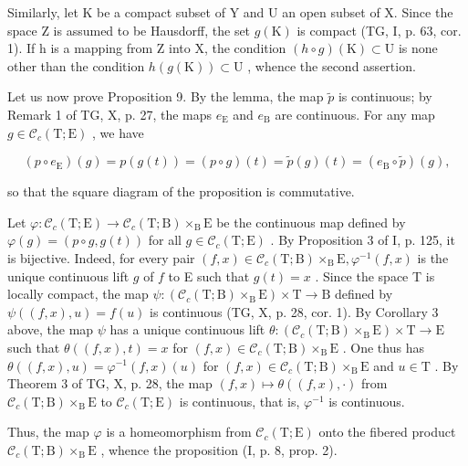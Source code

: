 Similarly, let K be a compact subset of Y and U an open subset of X. Since the space Z is assumed to be Hausdorff, the set \(g(\mathrm{K})\) is compact (TG, I, p. 63, cor. 1). If h is a mapping from Z into X, the condition \((h \circ g)(\mathrm{K}) \subset \mathrm{U}\) is none other than the condition \(h(g(\mathrm{K})) \subset \mathrm{U}\) , whence the second assertion.

Let us now prove Proposition 9. By the lemma, the map \(\widetilde{p}\) is continuous; by Remark 1 of TG, X, p. 27, the maps \(e_{\mathrm{E}}\) and \(e_{\mathrm{B}}\) are continuous. For any map \(g \in \mathcal{C}_c(\mathrm{T};\mathrm{E})\) , we have

\[
(p \circ e _ {\mathrm{E}}) (g) = p (g (t)) = (p \circ g) (t) = \widetilde {p} (g) (t) = \left(e _ {\mathrm{B}} \circ \widetilde {p}\right) (g),
\]

so that the square diagram of the proposition is commutative.

Let \(\varphi\colon\mathcal{C}_{c}(\mathrm{T};\mathrm{E})\to\mathcal{C}_{c}(\mathrm{T};\mathrm{B})\times_{\mathrm{B}}\mathrm{E}\) be the continuous map defined by \(\varphi(g)=(p\circ g,g(t))\) for all \(g\in\mathcal{C}_{c}(\mathrm{T};\mathrm{E})\) . By Proposition 3 of I, p. 125, it is bijective. Indeed, for every pair \((f,x)\in\mathcal{C}_{c}(\mathrm{T};\mathrm{B})\times_{\mathrm{B}}\mathrm{E},\varphi^{-1}(f,x)\) is the unique continuous lift \(g\) of \(f\) to E such that \(g(t)=x\) . Since the space T is locally compact, the map \(\psi\colon(\mathcal{C}_{c}(\mathrm{T};\mathrm{B})\times_{\mathrm{B}}\mathrm{E})\times\mathrm{T}\to\mathrm{B}\) defined by \(\psi((f,x),u)=f(u)\) is continuous (TG, X, p. 28, cor. 1). By Corollary 3 above, the map \(\psi\) has a unique continuous lift \(\theta\colon(\mathcal{C}_{c}(\mathrm{T};\mathrm{B})\times_{\mathrm{B}}\mathrm{E})\times\mathrm{T}\to\mathrm{E}\) such that \(\theta((f,x),t)=x\) for \((f,x)\in\mathcal{C}_{c}(\mathrm{T};\mathrm{B})\times_{\mathrm{B}}\mathrm{E}\) . One thus has \(\theta((f,x),u)=\varphi^{-1}(f,x)(u)\) for \((f,x)\in\mathcal{C}_{c}(\mathrm{T};\mathrm{B})\times_{\mathrm{B}}\mathrm{E}\) and \(u\in\mathrm{T}\) . By Theorem 3 of TG, X, p. 28, the map \((f,x)\mapsto\theta((f,x),\cdot)\) from \(\mathcal{C}_{c}(\mathrm{T};\mathrm{B})\times_{\mathrm{B}}\mathrm{E}\) to \(\mathcal{C}_{c}(\mathrm{T};\mathrm{E})\) is continuous, that is, \(\varphi^{-1}\) is continuous.

Thus, the map \(\varphi\) is a homeomorphism from \(\mathcal{C}_c(\mathrm{T};\mathrm{E})\) onto the fibered product \(\mathcal{C}_c(\mathrm{T};\mathrm{B})\times_{\mathrm{B}}\mathrm{E}\) , whence the proposition (I, p. 8, prop. 2).

